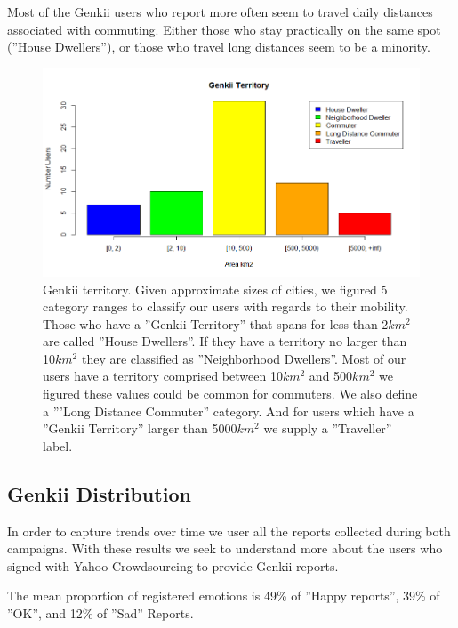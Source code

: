 \documentclass[letterpaper]{article}
\begin{document}
Most of the Genkii users who report more often seem to travel daily distances associated with commuting. Either those who stay practically on  the same spot (''House Dwellers''), or those who travel long distances seem to be a minority.

\begin{figure}[htb]
	\begin{center}
		\includegraphics[width=1\linewidth]{images/territory}
		\caption{Genkii territory. Given approximate sizes of cities, we figured 5 category ranges to classify our users with regards to their mobility. Those who have a ''Genkii Territory'' that spans for less than 2$km^2$ are called ''House Dwellers''. If they have a territory no larger than 10$km^2$ they are classified as ''Neighborhood Dwellers''. Most of our users have a territory comprised between 10$km^2$ and 500$km^2$ we figured these values could be common for commuters.
			We also define a '''Long Distance Commuter'' category. And for  users which have a ''Genkii Territory'' larger than 5000$km^2$ we supply a ''Traveller'' label. \label{fig:territory}}
	\end{center}
\end{figure}




\subsection{Genkii Distribution}

In order to capture trends over time we user all the reports collected during both campaigns.
With these results we seek to understand more about the users who signed with Yahoo Crowdsourcing to provide Genkii reports.

The mean proportion of registered emotions is 49\% of ''Happy reports'', 39\% of ''OK'', and 12\% of ''Sad'' Reports.
\end{document}
